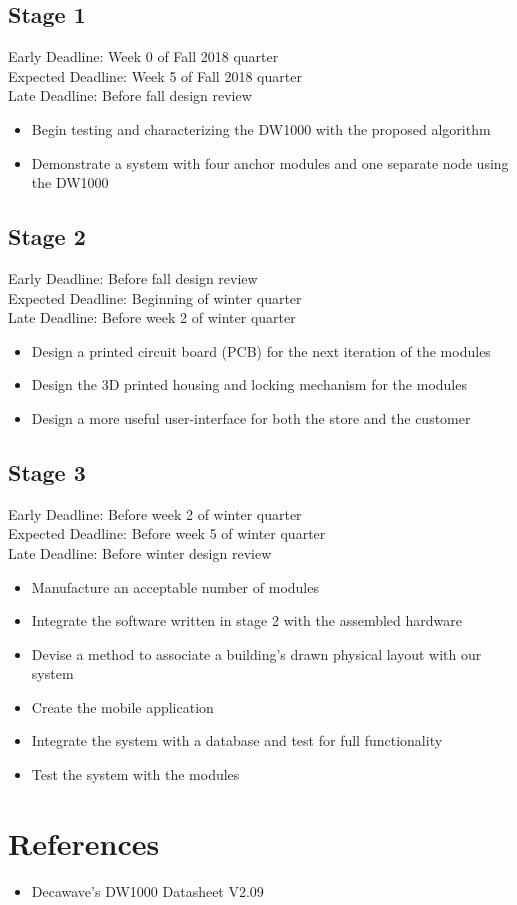 \documentclass{article}
\begin{document}
\subsection{Stage 1}
Early Deadline: Week 0 of Fall 2018 quarter \\
Expected Deadline: Week 5 of Fall 2018 quarter \\
Late Deadline: Before fall design review \\
\begin{itemize}
\item Begin testing and characterizing the DW1000 with the proposed algorithm
\item Demonstrate a system with four anchor modules and one separate node using the DW1000
\end{itemize}

\subsection{Stage 2}
Early Deadline: Before fall design review \\
Expected Deadline: Beginning of winter quarter \\
Late Deadline: Before week 2 of winter quarter \\
\begin{itemize}
\item Design a printed circuit board (PCB) for the next iteration of the modules
\item Design the 3D printed housing and locking mechanism for the modules
\item Design a more useful user-interface for both the store and the customer
\end{itemize}

\subsection{Stage 3}
Early Deadline: Before week 2 of winter quarter \\
Expected Deadline: Before week 5 of winter quarter \\
Late Deadline: Before winter design review \\
\begin{itemize}
\item Manufacture an acceptable number of modules
\item Integrate the software written in stage 2 with the assembled hardware
\item Devise a method to associate a building's drawn physical layout with our system
\item Create the mobile application
\item Integrate the system with a database and test for full functionality
\item Test the system with the modules
\end{itemize}

\section{References}
\begin{itemize}
\item Decawave's DW1000 Datasheet V2.09
\end{itemize}
\end{document}
